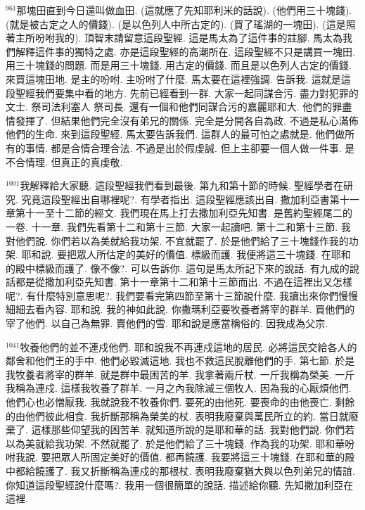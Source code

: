 \documentclass{book}
\begin{document}
$^{961}$那塊田直到今日還叫做血田.
(這就應了先知耶利米的話說).
(他們用三十塊錢).
(就是被古定之人的價錢).
(是以色列人中所古定的).
(買了瑤湖的一塊田).
(這是照著主所吩咐我的).
頂智末請留意這段聖經.
這是馬太為了這件事的註腳.
馬太為我們解釋這件事的獨特之處.
亦是這段聖經的高潮所在.
這段聖經不只是講買一塊田.
用三十塊錢的問題.
而是用三十塊錢.
用古定的價錢.
而且是以色列人古定的價錢.
來買這塊田地.
是主的吩咐.
主吩咐了什麼.
馬太要在這裡強調.
告訴我.
這就是這段聖經我們要集中看的地方.
先前已經看到一群.
大家一起同謀合污.
盡力對犯罪的文士.
祭司法利塞人 祭司長.
還有一個和他們同謀合污的嘉麗耶和大.
他們的罪盡情發揮了.
但結果他們完全沒有弟兄的關係.
完全是分開各自為政.
不過是私心滿佈他們的生命.
來到這段聖經.
馬太要告訴我們.
這群人的最可怕之處就是.
他們做所有的事情.
都是合情合理合法.
不過是出於假虔誠.
但上主卻要一個人做一件事.
是不合情理.
但真正的真虔敬.

$^{1001}$我解釋給大家聽.
這段聖經我們看到最後.
第九和第十節的時候.
聖經學者在研究.
究竟這段聖經出自哪裡呢?.
有學者指出.
這段聖經應該出自.
撒加利亞書第十一章第十一至十二節的經文.
我們現在馬上打去撒加利亞先知書.
是舊約聖經尾二的一卷.
十一章.
我們先看第十二和第十三節.
大家一起讀吧.
第十二和第十三節.
我對他們說.
你們若以為美就給我功架.
不宜就罷了.
於是他們給了三十塊錢作我的功架.
耶和說.
要把眾人所估定的美好的價值.
標級而護.
我便將這三十塊錢.
在耶和的殿中標級而護了.
像不像?.
可以告訴你.
這句是馬太所記下來的說話.
有九成的說話都是從撒加利亞先知書.
第十一章第十二和第十三節而出.
不過在這裡出又怎樣呢?.
有什麼特別意思呢?.
我們要看完第四節至第十三節說什麼.
我讀出來你們慢慢細細去看內容.
耶和說.
我的神如此說.
你撒瑪利亞要牧養者將宰的群羊.
買他們的宰了他們.
以自己為無罪.
賣他們的雪.
耶和說是應當稱俗的.
因我成為父宗.

$^{1041}$牧養他們的並不連戍他們.
耶和說我不再連戍這地的居民.
必將這民交給各人的鄰舍和他們王的手中.
他們必毀滅這地.
我也不救這民脫離他們的手.
第七節.
於是我牧養者將宰的群羊.
就是群中最困苦的羊.
我拿著兩斤杖.
一斤我稱為榮美.
一斤我稱為連戍.
這樣我牧養了群羊.
一月之內我除滅三個牧人.
因為我的心厭煩他們.
他們心也必憎厭我.
我就說我不牧養你們.
要死的由他死.
要喪命的由他喪亡.
剩餘的由他們彼此相食.
我折斷那稱為榮美的杖.
表明我廢棄與萬民所立的約.
當日就廢棄了.
這樣那些仰望我的困苦羊.
就知道所說的是耶和華的話.
我對他們說.
你們若以為美就給我功架.
不然就罷了.
於是他們給了三十塊錢.
作為我的功架.
耶和華吩咐我說.
要把眾人所固定美好的價值.
都再饒護.
我要將這三十塊錢.
在耶和華的殿中都給饒護了.
我又折斷稱為連戍的那根杖.
表明我廢棄猶大與以色列弟兄的情誼.
你知道這段聖經說什麼嗎?.
我用一個很簡單的說話.
描述給你聽.
先知撒加利亞在這裡.
\end{document}
